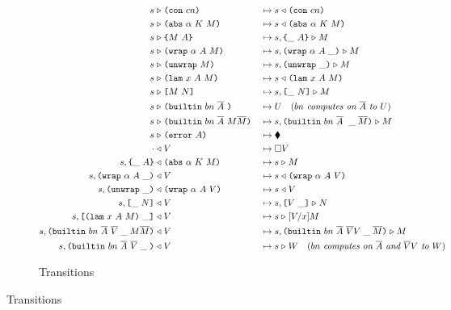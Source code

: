 \begin{figure}[!ht]
\begin{subfigure}[c]{\linewidth}   %
{\small
\caption{Transitions}
     \begin{alignat*}{2}
      s &\compute \con{cn}                 &{}\mapsto{}& s \return \con{cn}\\
      s &\compute \abs{\alpha}{K}{M}       &{}\mapsto{}& s \return \abs{\alpha}{K}{M}\\
      s &\compute \inst{M}{A}              &{}\mapsto{}& s,\inInstLeftFrame{A} \compute M\\
      s &\compute \wrap{\alpha}{A}{M}      &{}\mapsto{}& s,\inWrapRightFrame{\alpha}{A} \compute M\\
      s &\compute \unwrap{M}               &{}\mapsto{}& s,\inUnwrapFrame{} \compute M\\
      s &\compute \lam{x}{A}{M}            &{}\mapsto{}& s \return \lam{x}{A}{M}\\
      s &\compute \app{M}{N}               &{}\mapsto{}& s,\inAppLeftFrame{N} \compute M\\
      s &\compute \builtin{bn}{\repetition{A}}{} &{}\mapsto{}& 
                                      U \quad (\textit{$bn$ computes on $\repetition{A}$ to $U$})\\
      s &\compute \builtin{bn}{\repetition{A}}{M \repetition{M}} &{}\mapsto{}& 
                                      s, \inBuiltin{bn}{\repetition{A}}{}{\_}{\repetition{M}} \compute {M}\\
      s &\compute \error{A} &{}\mapsto{}& \ckerror{}\\
      \cdot &\return V &{}\mapsto{}& \square V\\
      s,\inInstLeftFrame{A} &\return \abs{\alpha}{K}{M} &{}\mapsto{}& s \compute{M} \\
      s,\inWrapRightFrame{\alpha}{A} &\return V         &{}\mapsto{}& s \return \wrap{\alpha}{A}{V}\\
      s,\inUnwrapFrame{} &\return {\wrap{\alpha}{A}{V}} &{}\mapsto{}& s \return V\\
      s,\inAppLeftFrame{N} &\return V                   &{}\mapsto{}& s, \inAppRightFrame{V} \compute N\\
      s,\inAppRightFrame{\lam{x}{A}{M}} &\return V      &{}\mapsto{}& s \compute \subst{V}{x}{M}\\
      s,  \inBuiltin{bn}{\repetition{A}}{\repetition{V}}{\_}{M \repetition{M}} &\return V &{}\mapsto{}& s, \inBuiltin{bn}{\repetition{A}}{\repetition{V} V}{\_}{\repetition{M}} \compute M\\
      s,\inBuiltin{bn}{\repetition{A}}{\repetition{V}}{\_}{} &\return V &{}\mapsto{}& s \compute W \quad (\textit{$bn$ computes on $\repetition{A}$ and $\repetition{V}V$ to $W$})\\
    \end{alignat*}
}
\end{subfigure}
\end{figure}


